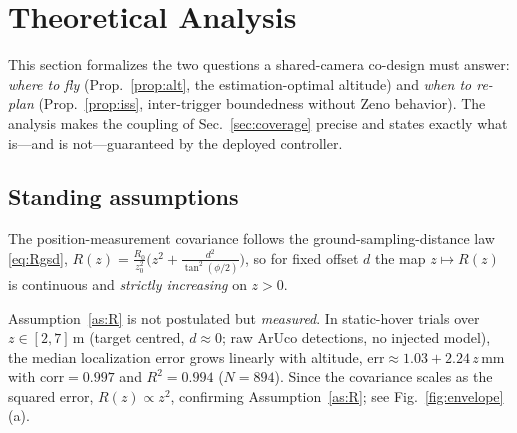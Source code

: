 
\section{Theoretical Analysis}
\label{sec:theory-formal}

This section formalizes the two questions a shared-camera co-design must answer:
\emph{where to fly} (Prop.~\ref{prop:alt}, the estimation-optimal altitude) and
\emph{when to re-plan} (Prop.~\ref{prop:iss}, inter-trigger boundedness without
Zeno behavior). The analysis makes the coupling of Sec.~\ref{sec:coverage}
precise and states exactly what is—and is not—guaranteed by the deployed controller.

\subsection{Standing assumptions}

\begin{assumption}\label{as:R}
The position-measurement covariance follows the ground-sampling-distance law
\eqref{eq:Rgsd}, $R(z)=\tfrac{R_0}{z_0^2}\big(z^2+\tfrac{d^2}{\tan^2(\phi/2)}\big)$,
so for fixed offset $d$ the map $z\mapsto R(z)$ is continuous and
\emph{strictly increasing} on $z>0$.
\end{assumption}

\begin{remark}\label{rem:e0}
Assumption~\ref{as:R} is not postulated but \emph{measured}. In static-hover
trials over $z\in[2,7]$\,m (target centred, $d\!\approx\!0$; raw ArUco detections,
no injected model), the median localization error grows linearly with altitude,
$\mathrm{err}\approx 1.03+2.24\,z$\,mm with $\mathrm{corr}=0.997$ and
$R^2=0.994$ ($N=894$). Since the covariance scales as the squared error,
$R(z)\propto z^2$, confirming Assumption~\ref{as:R}; see Fig.~\ref{fig:envelope}(a).
\end{remark}

